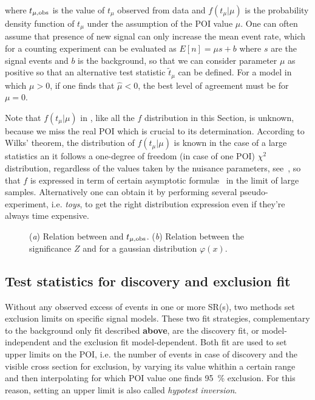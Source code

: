 where $t_{\mu,\textup{obs}}$ is the value of $t_\mu$ observed from data and $f\left(t_\mu \vert \mu\right)$ is the probability density function of $t_\mu$ under the assumption of the POI value $\mu$. One can often assume that presence of new signal can only increase the mean event rate, which for a counting experiment can be evaluated as $E[n] = \mu s + b$ where $s$ are the signal events and $b$ is the background, so that we can consider parameter $\mu$ as positive so that an alternative test statistic $\tilde{t}_\mu$ can be defined. For a model in which $\mu>0$, if one finds that $\hat{\mu}<0$, the best level of agreement must be for $\mu=0$.

Note that $f\left(t_\mu \vert \mu\right)$ in \Eqn{\ref{eqn:pdatmu}}, like all the $f$ distribution in this Section, is unknown, because we miss the real POI which is crucial to its determination. According to Wilks' theorem, the distribution of $f(t_\mu \vert \mu)$ is known in the case of a large statistics an it follows a one-degree of freedom (in case of one POI) $\chi^2$ distribution, regardless of the values taken by the nuisance parameters, see~\cite[]{Cowan}, so that $f$ is expressed in term of certain asymptotic formul\ae~ in the limit of large samples. Alternatively one can obtain it by performing several pseudo-experiment, i.e. \emph{toys}, to get the right distribution expression even if they're always time expensive.

\begin{figure}[tp]
\centering
{}
\caption{(\emph{a}) Relation between \p and $t_{\mu,\textup{obs}}$. (\emph{b}) Relation between the significance $Z$ and \p for a gaussian distribution $\varphi(x)$.}
\label{pvalue}
\end{figure}

\subsection{Test statistics for discovery and exclusion fit}
Without any observed excess of events in one or more SR(s), two methods set exclusion
limits on specific signal models. These two fit strategies, complementary to the background only fit described {\bf above}, are the discovery fit, or model-independent and the exclusion fit model-dependent. Both fit are used to set upper limits on the POI, i.e. the number of events in case of discovery and the visible cross section for exclusion, by varying its value whithin a certain range and then interpolating for which POI value one finds \SI{95}{\percent} exclusion. For this reason, setting an upper limit is also called \emph{hypotest inversion}.

